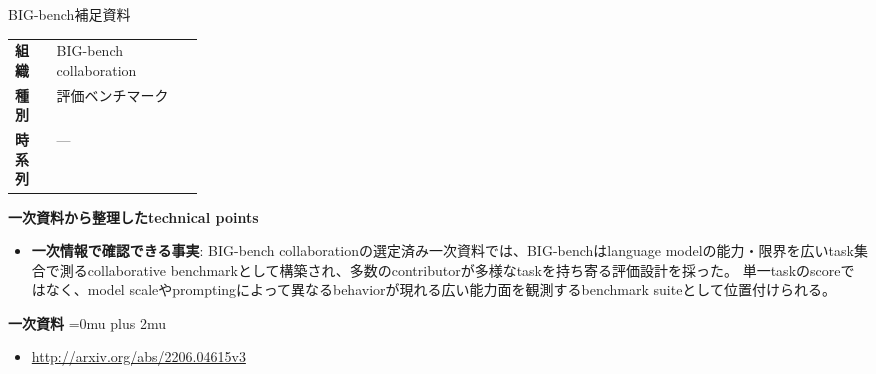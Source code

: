 \begin{technicalnote}{BIG-bench}{補足資料}
\begingroup
\begin{tabularx}{\linewidth}{@{}>{\bfseries}p{0.22\linewidth}X@{}}
組織 & BIG-bench collaboration \\
種別 & 評価ベンチマーク \\
時系列 & — \\
\end{tabularx}
\smallskip
{\bfseries 一次資料から整理したtechnical points}
\begin{itemize}[leftmargin=1.5em,itemsep=0.35em]
\item \textbf{一次情報で確認できる事実}: BIG-bench collaborationの選定済み一次資料では、BIG-benchはlanguage modelの能力・限界を広いtask集合で測るcollaborative benchmarkとして構築され、多数のcontributorが多様なtaskを持ち寄る評価設計を採った。 単一taskのscoreではなく、model scaleやpromptingによって異なるbehaviorが現れる広い能力面を観測するbenchmark suiteとして位置付けられる。
\end{itemize}
\begin{minipage}{\linewidth}
\begin{samepage}
{\bfseries 一次資料}
\begingroup\sloppy
\Urlmuskip=0mu plus 2mu\relax
\begin{itemize}[leftmargin=1.5em,itemsep=0.25em]
\item {\scriptsize\url{http://arxiv.org/abs/2206.04615v3}}
\end{itemize}
\endgroup
\end{samepage}
\end{minipage}
\endgroup
\end{technicalnote}
\medskip
